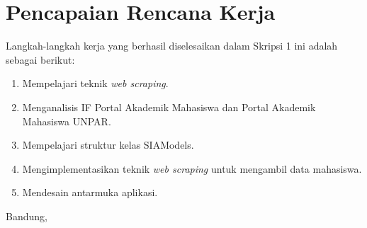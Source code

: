 \documentclass[a4paper,twoside]{article}
\begin{document}
\section{Pencapaian Rencana Kerja}
Langkah-langkah kerja yang berhasil diselesaikan dalam Skripsi 1 ini adalah sebagai berikut:
\begin{enumerate}
\item Mempelajari teknik \textit{web scraping}.
\item Menganalisis IF Portal Akademik Mahasiswa dan Portal Akademik Mahasiswa UNPAR.
\item Mempelajari struktur kelas SIAModels.
\item Mengimplementasikan teknik \textit{web scraping} untuk mengambil data mahasiswa.
\item Mendesain antarmuka aplikasi.
\end{enumerate}




\vspace{1cm}
\centering Bandung, \tanggal\\
\vspace{2cm} \nama \\ 
\vspace{1cm}
\end{document}
